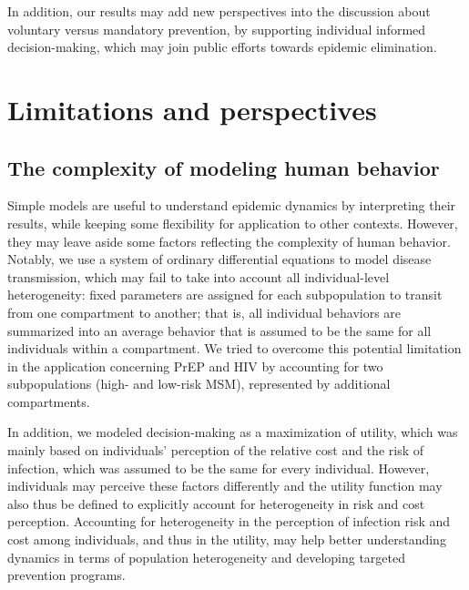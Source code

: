 In addition, our results may add new perspectives into the discussion about voluntary versus mandatory prevention, by supporting individual informed decision-making, which may join public efforts towards epidemic elimination.

\section{Limitations and perspectives}

\subsection{The complexity of modeling human behavior}
Simple models are useful to understand epidemic dynamics by interpreting their results, while keeping some flexibility for application to other contexts. However, they may leave aside some factors reflecting the complexity of human behavior. Notably, we use a system of ordinary differential equations to model disease transmission, which may fail to take into account all individual-level heterogeneity: fixed parameters are assigned for each subpopulation to transit from one compartment to another; that is, all individual behaviors are summarized into an average behavior that is assumed to be the same for all individuals within a compartment. We tried to overcome this potential limitation in the application concerning PrEP and HIV by accounting for two subpopulations (high- and low-risk MSM), represented by additional compartments. 

In addition, we modeled decision-making as a maximization of utility, which was mainly based on individuals' perception of the relative cost and the risk of infection, which was assumed to be the same for every individual. However, individuals may perceive these factors differently and the utility function may also thus be defined to explicitly account for heterogeneity in risk and cost perception. Accounting for heterogeneity in the perception of infection risk and cost among individuals, and thus in the utility, may help better understanding dynamics in terms of population heterogeneity and developing targeted prevention programs.


